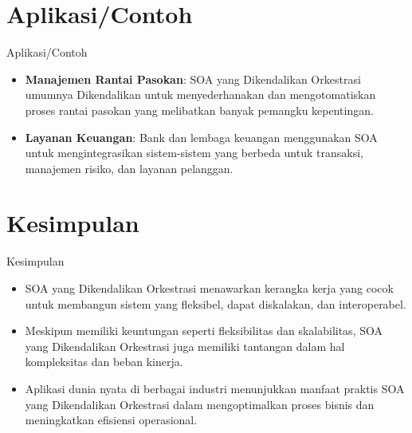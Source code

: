 \documentclass[aspectratio=169, table]{beamer}
\begin{document}
   \section{Aplikasi/Contoh}
   \begin{frame}{Aplikasi/Contoh}
       \begin{itemize}
           \item \textbf{Manajemen Rantai Pasokan}: SOA yang Dikendalikan Orkestrasi umumnya Dikendalikan untuk menyederhanakan dan mengotomatiskan proses rantai pasokan yang melibatkan banyak pemangku kepentingan.
           \item \textbf{Layanan Keuangan}: Bank dan lembaga keuangan menggunakan SOA untuk mengintegrasikan sistem-sistem yang berbeda untuk transaksi, manajemen risiko, dan layanan pelanggan.
       \end{itemize}
   \end{frame}

   \section{Kesimpulan}
   \begin{frame}{Kesimpulan}
       \begin{itemize}
           \item SOA yang Dikendalikan Orkestrasi menawarkan kerangka kerja yang cocok untuk membangun sistem yang fleksibel, dapat diskalakan, dan interoperabel.
           \item Meskipun memiliki keuntungan seperti fleksibilitas dan skalabilitas, SOA yang Dikendalikan Orkestrasi juga memiliki tantangan dalam hal kompleksitas dan beban kinerja.
           \item Aplikasi dunia nyata di berbagai industri menunjukkan manfaat praktis SOA yang Dikendalikan Orkestrasi dalam mengoptimalkan proses bisnis dan meningkatkan efisiensi operasional.
       \end{itemize}
   \end{frame}
\end{document}
